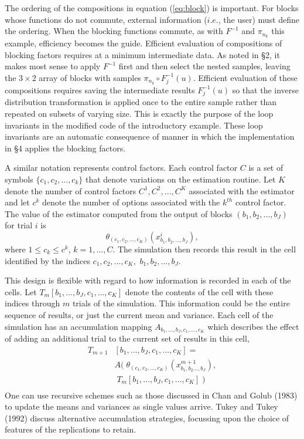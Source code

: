 The ordering of the compositions in equation (\ref{eq:block}) is
important. For blocks whose functions do not commute, external
information ($i.e.$, the user) must define the ordering.  When the
blocking functions commute, as with $F^{-1}$ and $\pi_{n_k}$ this
example, efficiency becomes the guide. Efficient evaluation of
compositions of blocking factors requires at a minimum intermediate
data.  As noted in \S2, it makes most sense to apply $F^{-1}$ first and
then select the nested samples, leaving the $ 3 \times 2$ array of
blocks with samples $\pi_{n_k} \circ F_j^{-1}(u)$. Efficient evaluation
of these compositions requires saving the intermediate results
$F_j^{-1}(u)$ so that the inverse distribution transformation is
applied once to the entire sample rather than repeated on subsets of
varying size. This is exactly the purpose of the loop invariants in the
modified code of the introductory example.  These loop invariants are
an automatic consequence of manner in which the implementation in \S4
applies the blocking factors.


A similar notation represents control factors. Each control factor
$C$ is a set of symbols $\{c_1,c_2,\ldots,c_k\}$ that denote
variations on the estimation routine. Let $K$ denote the number of
control factors $C^1,C^2,\ldots,C^K$ associated with the estimator
and let $c^k$ denote the number of options associated with the $k^{th}$
control factor.  The value of the estimator computed from the output of
blocks $(b_1,b_2,\ldots,b_J)$ for trial $i$ is
\begin{equation}
\theta_{(c_1,c_2,\ldots,c_K)}(x^i_{b_1,b_2,\ldots,b_J}),
\label{eq:theta}
\end{equation}
where $1 \leq c_k \leq c^k$, $k=1,\ldots,C$. The simulation then
records this result in the cell identified by the indices
$c_1,c_2,\ldots,c_K,$ $b_1,b_2,\ldots,b_J$.


This design is flexible with regard to how information is recorded in
each of the cells.  Let $T_m[b_1,\ldots,b_J,c_1,\ldots,c_K]$
denote the contents of the cell with these indices through $m$
trials of the simulation.  This information could be the entire
sequence of results, or just the current mean and variance.  Each
cell of the simulation has an accumulation mapping $A_{b_1,\ldots,
b_J,c_1,\ldots,c_K}$ which describes the effect of adding an additional
trial to the current set of results in this cell,   
\begin{equation} \begin{array}{rl}
T_{m+1}&[b_1,\ldots,b_J, c_1,\ldots,c_K] = \\
  &A(\;\theta_{(c_1,c_2,\ldots,c_K)}(x_{b_1,b_2\ldots,b_J}^{m+1}),\\
  &  \;      T_m[b_1,\ldots,b_J,c_1,\ldots,c_K]\;)  \\
\label{eq:accum}
\end{array}\end{equation}
One can use recursive schemes such as those discussed in Chan
and Golub (1983) to update the means and variances as
single values arrive.  Tukey and Tukey (1992) discuss
alternative accumulation strategies, focussing upon the choice of
features of the replications to retain.   


